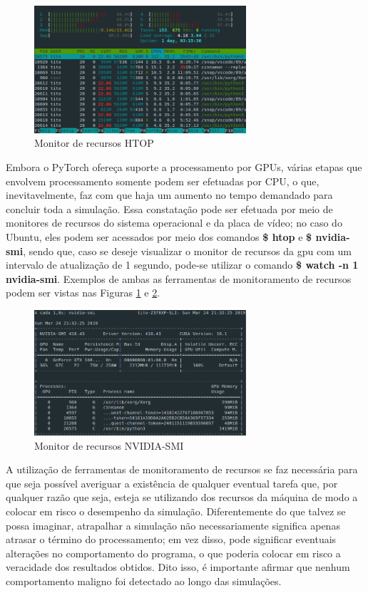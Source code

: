 \begin{figure}[H]
    \centering
    \includegraphics[width=0.70\textwidth]{figs/htop.png}
    \caption{Monitor de recursos HTOP}
    \label{fig:results_htop}
\end{figure}

Embora o PyTorch ofereça suporte a processamento por GPUs, várias etapas que envolvem processamento somente podem ser efetuadas por CPU, o que, inevitavelmente, faz com que haja um aumento no tempo demandado para concluir toda a simulação. Essa constatação pode ser efetuada por meio de monitores de recursos do sistema operacional e da placa de vídeo; no caso do Ubuntu, eles podem ser acessados por meio dos comandos \textbf{\$ htop} e \textbf{\$ nvidia-smi}, sendo que, caso se deseje visualizar o monitor de recursos da gpu com um intervalo de atualização de 1 segundo, pode-se utilizar o comando \textbf{\$ watch -n 1 nvidia-smi}. Exemplos de ambas as ferramentas de monitoramento de recursos podem ser vistas nas Figuras \ref{fig:results_htop} e \ref{fig:results_nvidia-smi}.


\begin{figure}[H]
    \centering
    \includegraphics[width=0.70\textwidth]{figs/nvidia-smi.png}
    \caption{Monitor de recursos NVIDIA-SMI}
    \label{fig:results_nvidia-smi}
\end{figure}


A utilização de ferramentas de monitoramento de recursos se faz necessária para que seja possível averiguar a existência de qualquer eventual tarefa que, por qualquer razão que seja, esteja se utilizando dos recursos da máquina de modo a colocar em risco o desempenho da simulação. Diferentemente do que talvez se possa imaginar, atrapalhar a simulação não necessariamente significa apenas atrasar o término do processamento; em vez disso, pode significar eventuais alterações no comportamento do programa, o que poderia colocar em risco a veracidade dos resultados obtidos. Dito isso, é importante afirmar que nenhum comportamento maligno foi detectado ao longo das simulações.



